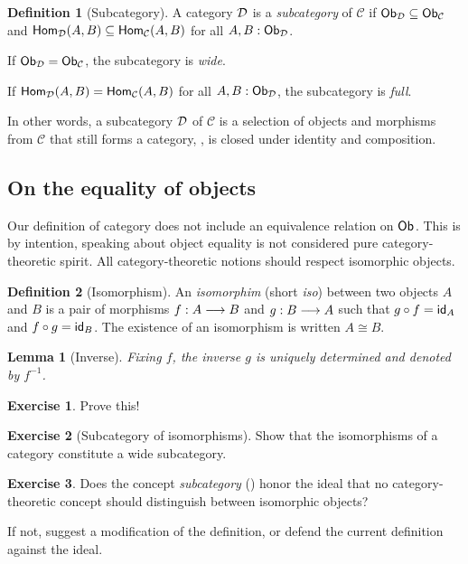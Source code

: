 \documentclass[a4paper,fleqn]{scrartcl}
\newtheorem{lemma}{Lemma}
\theoremstyle{definition}
\newtheorem{definition}{Definition}
\newtheorem{remark}{Remark}
\newtheorem{exercise}{Exercise}
\newcommand{\C}{\mathcal{C}}
\begin{document}
\begin{definition}[Subcategory]
  \label{def:subcat}
  A category $\D$ is a \emph{subcategory} of $\C$ if $\Ob[\D]
  \subseteq \Ob[\C]$ and $\Hom[\D](A,B) \subseteq \Hom[\C](A,B)$ for
  all $A,B : \Ob[\D]$.

  If $\Ob[\D] = \Ob[\C]$, the subcategory is \emph{wide}.

  If $\Hom[\D](A,B) = \Hom[\C](A,B)$ for
  all $A,B : \Ob[\D]$, the subcategory is \emph{full}.
\end{definition}
In other words, a subcategory $\D$ of $\C$ is a selection of objects
and morphisms from $\C$ that still forms a category, \ie, is closed
under identity and composition.

\subsection{On the equality of objects}

Our definition of category does not include an equivalence relation on
$\Ob$.  This is by intention, speaking about object equality is not
considered pure category-theoretic spirit.  All category-theoretic
notions should respect isomorphic objects.
\begin{definition}[Isomorphism]
  An \emph{isomorphim} (short \emph{iso}) between two objects $A$ and
  $B$ is a pair of morphisms $f : A \too B$ and $g : B \too A$ such
  that $g \comp f = \id[A]$ and $f \comp g = \id[B]$.
  The existence of an isomorphism is written $A \cong B$.
\end{definition}
\begin{lemma}[Inverse]
  Fixing $f$, the inverse $g$ is uniquely determined and denoted by $f^{-1}$.
\end{lemma}
\begin{exercise}
  Prove this!
\end{exercise}
\begin{exercise}[Subcategory of isomorphisms]
  Show that the isomorphisms of a category constitute a wide subcategory.
\end{exercise}
\begin{exercise}
  Does the concept \emph{subcategory} () honor the
  ideal that no category-theoretic concept should distinguish between
  isomorphic objects?

  If not, suggest a modification of the definition, or defend the
  current definition against the ideal.
\end{exercise}
\end{document}

